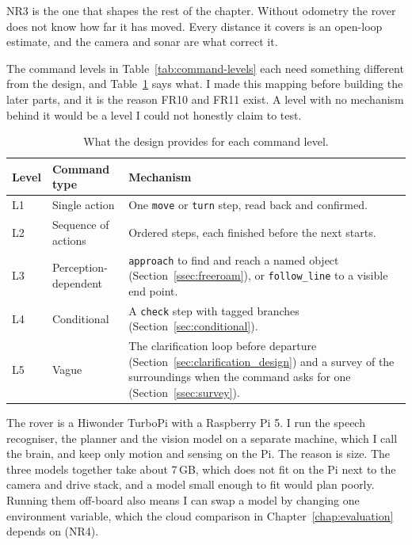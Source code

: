NR3 is the one that shapes the rest of the chapter. Without odometry the rover
does not know how far it has moved. Every distance it covers is an open-loop
estimate, and the camera and sonar are what correct it.

The command levels in Table~\ref{tab:command-levels} each need something
different from the design, and Table~\ref{tab:level_map} says what. I made this
mapping before building the later parts, and it is the reason FR10 and FR11
exist. A level with no mechanism behind it would be a level I could not
honestly claim to test.

\begin{table}[htbp]
  \centering
  \caption{What the design provides for each command level.}
  \label{tab:level_map}
  \small
  \begin{tabular}{@{}l p{4.0cm} p{6.4cm}@{}}
    \toprule
    Level & Command type & Mechanism \\
    \midrule
    L1 & Single action & One \texttt{move} or \texttt{turn} step, read back and confirmed. \\
    L2 & Sequence of actions & Ordered steps, each finished before the next starts. \\
    L3 & Perception-dependent & \texttt{approach} to find and reach a named object (Section~\ref{ssec:freeroam}), or \texttt{follow\_line} to a visible end point. \\
    L4 & Conditional & A \texttt{check} step with tagged branches (Section~\ref{sec:conditional}). \\
    L5 & Vague & The clarification loop before departure (Section~\ref{sec:clarification_design}) and a survey of the surroundings when the command asks for one (Section~\ref{ssec:survey}). \\
    \bottomrule
  \end{tabular}
\end{table}

\label{sec:architecture}

\label{ssec:split}

The rover is a Hiwonder TurboPi with a Raspberry Pi 5. I run the speech
recogniser, the planner and the vision model on a separate machine, which I call
the brain, and keep only motion and sensing on the Pi. The reason is size. The
three models together take about 7\,GB, which does not fit on the Pi next to the
camera and drive stack, and a model small enough to fit would plan poorly. Running
them off-board also means I can swap a model by changing one environment
variable, which the cloud comparison in Chapter~\ref{chap:evaluation} depends on
(NR4).

